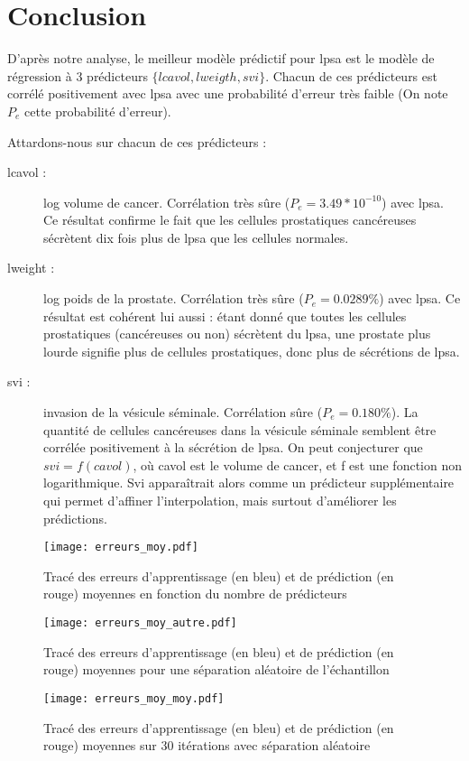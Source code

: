 \documentclass[a4paper, 12pt]{article}
\begin{document}
\section{Conclusion}

D'après notre analyse, le meilleur modèle prédictif pour lpsa est le modèle de régression à 3 prédicteurs $\{lcavol, lweigth, svi\}$. 
Chacun de ces prédicteurs est corrélé positivement avec lpsa avec une probabilité d'erreur très faible (On note $P_{e}$ cette probabilité d'erreur).

Attardons-nous sur chacun de ces prédicteurs :

\begin{description}
\item[lcavol :] log volume de cancer. Corrélation très sûre ($P_e = 3.49*10^{-10}$) avec lpsa. Ce résultat confirme le fait que les cellules prostatiques cancéreuses sécrètent dix fois plus de lpsa que les cellules normales.
\item[lweight :] log poids de la prostate. Corrélation très sûre ($P_e = 0.0289 \%$) avec lpsa. Ce résultat est cohérent lui aussi : étant donné que toutes les cellules prostatiques (cancéreuses ou non) sécrètent du lpsa, une prostate plus lourde signifie plus de cellules prostatiques, donc plus de sécrétions de lpsa.
\item[svi :] invasion de la vésicule séminale. Corrélation sûre ($P_e = 0.180 \%$). La quantité de cellules cancéreuses dans la vésicule séminale semblent être corrélée positivement à la sécrétion de lpsa. On peut conjecturer que $svi = f(cavol)$, où cavol est le volume de cancer, et f est une fonction non logarithmique. Svi apparaîtrait alors comme un prédicteur supplémentaire qui permet d'affiner l'interpolation, mais surtout d'améliorer les prédictions.
\end{description}

\begin{figure}
\begin{center}
\texttt{[image: erreurs\_moy.pdf]}
\caption{Tracé des erreurs d'apprentissage (en bleu) et de prédiction (en rouge) moyennes en fonction du nombre de prédicteurs}
\end{center}
\end{figure}

\begin{figure}
\begin{center}
\texttt{[image: erreurs\_moy\_autre.pdf]}
\caption{Tracé des erreurs d'apprentissage (en bleu) et de prédiction (en rouge) moyennes pour une séparation aléatoire de l'échantillon}
\end{center}
\end{figure}

\begin{figure}
\begin{center}
\texttt{[image: erreurs\_moy\_moy.pdf]}
\caption{Tracé des erreurs d'apprentissage (en bleu) et de prédiction (en rouge) moyennes sur 30 itérations avec séparation aléatoire}
\end{center}
\end{figure}
\end{document}
